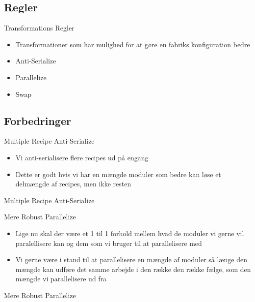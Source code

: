 \subsection{Regler}
\begin{frame}{Transformations Regler}
	\begin{itemize}
		\item Transformationer som har mulighed for at gøre en fabriks konfiguration bedre
		\item Anti-Serialize
		\item Parallelize
		\item Swap		
	\end{itemize}
\end{frame}


\subsection{Forbedringer}
\begin{frame}{Multiple Recipe Anti-Serialize}
	\begin{itemize}
		\item Vi anti-serialisere flere recipes ud på engang
		\item Dette er godt hvis vi har en mængde moduler som bedre kan løse et delmængde af recipes, men ikke resten
	\end{itemize}
\end{frame}

\begin{frame} {Multiple Recipe Anti-Serialize}
\end{frame}

\begin{frame}{Mere Robust Parallelize}
	\begin{itemize}
		\item Lige nu skal der være et 1 til 1 forhold mellem hvad de moduler vi gerne vil paralellisere kan og dem som vi bruger til at parallelisere med
		\item Vi gerne være i stand til at parallelisere en mængde af moduler så længe den mængde kan udføre det samme arbejde i den række den række fælge, som den mængde vi parallelisere ud fra
	\end{itemize}
\end{frame}

\begin{frame} {Mere Robust Parallelize}
\end{frame}





